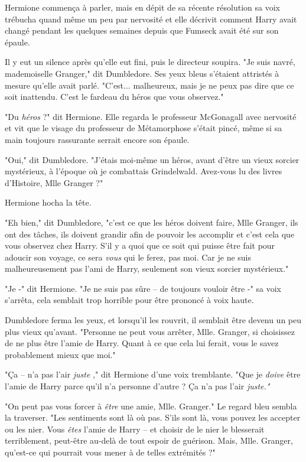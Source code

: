 Hermione commença à parler, mais en dépit de sa récente résolution sa voix trébucha quand même un peu par nervosité et elle décrivit comment Harry avait changé pendant les quelques semaines depuis que Fumseck avait été sur son épaule.

Il y eut un silence après qu'elle eut fini, puis le directeur soupira. "Je suis navré, mademoiselle Granger," dit Dumbledore. Ses yeux bleus s'étaient attristés à mesure qu'elle avait parlé. "C'est... malheureux, mais je ne peux pas dire que ce soit inattendu. C'est le fardeau du héros que vous observez."

"Du \emph{héros } ?" dit Hermione. Elle regarda le professeur McGonagall avec nervosité et vit que le visage du professeur de Métamorphose s'était pincé, même si sa main toujours rassurante serrait encore son épaule.

"Oui," dit Dumbledore. "J'étais moi-même un héros, avant d'être un vieux sorcier mystérieux, à l'époque où je combattais Grindelwald. Avez-vous lu des livres d'Histoire, Mlle Granger ?"

Hermione hocha la tête.

"Eh bien," dit Dumbledore, "c'est ce que les héros doivent faire, Mlle Granger, ils ont des tâches, ils doivent grandir afin de pouvoir les accomplir et c'est cela que vous observez chez Harry. S'il y a quoi que ce soit qui puisse être fait pour adoucir son voyage, ce sera \emph{vous}  qui le ferez, pas moi. Car je ne suis malheureusement pas l'ami de Harry, seulement son vieux sorcier mystérieux."

"Je -" dit Hermione. "Je ne suis pas sûre – de toujours vouloir être -" sa voix s'arrêta, cela semblait trop horrible pour être prononcé à voix haute.

Dumbledore ferma les yeux, et lorsqu'il les rouvrit, il semblait être devenu un peu plus vieux qu'avant. "Personne ne peut vous arrêter, Mlle. Granger, si choisissez de ne plus être l'amie de Harry. Quant à ce que cela lui ferait, vous le savez probablement mieux que moi."

"Ça – n'a pas l'air \emph{juste} ," dit Hermione d'une voix tremblante. "Que je \emph{doive}  être l'amie de Harry parce qu'il n'a personne d'autre ? Ça n'a pas l'air \emph{juste."} 

"On peut pas vous forcer à \emph{être}  une amie, Mlle. Granger." Le regard bleu sembla la traverser. "Les sentiments sont là où pas. S'ils sont là, vous pouvez les accepter ou les nier. Vous \emph{êtes}  l'amie de Harry – et choisir de le nier le blesserait terriblement, peut-être au-delà de tout espoir de guérison. Mais, Mlle. Granger, qu'est-ce qui pourrait vous mener à de telles extrémités ?"

